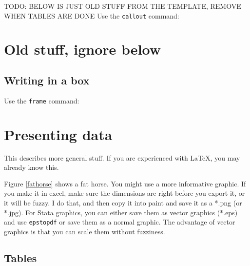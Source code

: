 \documentclass[10pt]{article}
\begin{document}
\newpage
TODO: BELOW IS JUST OLD STUFF FROM THE TEMPLATE, REMOVE WHEN TABLES ARE DONE
Use the \texttt{callout} command:


\section{Old stuff, ignore below}
\subsection{Writing in a box}

Use the \texttt{frame} command:


\section{Presenting data}

This describes more general stuff.  If you are experienced with \LaTeX, you may already know this.


Figure \ref{fathorse} shows a fat horse.  You might use a more informative graphic.  If you make it in excel, make sure the dimensions are right before you export it, or it will be fuzzy.  I do that, and then copy it into paint and save it as a *.png (or *.jpg).  For Stata graphics, you can either save them as vector graphics (*.eps) and use \texttt{epstopdf} or save them as a normal graphic.  The advantage of vector graphics is that you can scale them without fuzziness.

\subsection{Tables}
\end{document}
